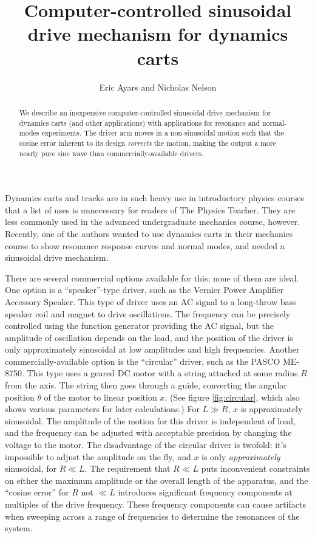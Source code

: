 \documentclass[11 pt]{article}
\title{Computer-controlled sinusoidal drive mechanism for dynamics carts}
\author{Eric Ayars and Nicholas Nelson}
\begin{document}
\maketitle

\begin{abstract}
We describe an inexpensive computer-controlled sinusoidal drive mechanism for dynamics carts (and other applications) with applications for resonance and normal-modes experiments.
The driver arm moves in a non-sinusoidal motion such that the cosine error inherent to its design \emph{corrects} the motion, making the output a more nearly pure sine wave than commercially-available drivers.
\end{abstract}

Dynamics carts and tracks are in such heavy use in introductory physics courses that a list of uses is unnecessary for readers of The Physics Teacher. 
They are less commonly used in the advanced undergraduate mechanics course, however.
Recently, one of the authors wanted to use dynamics carts in their mechanics course to show resonance response curves and normal modes, and needed a sinusoidal drive mechanism.

There are several commercial options available for this; none of them are ideal. 
One option is a ``speaker''-type driver, such as the Vernier Power Amplifier Accessory Speaker. 
This type of driver uses an AC signal to a long-throw bass speaker coil and magnet to drive oscillations. 
The frequency can be precisely controlled using the function generator providing the AC signal, but the amplitude of oscillation depends on the load, and the position of the driver is only approximately sinusoidal at low amplitudes and high frequencies.
Another commercially-available option is the ``circular'' driver, such as the PASCO ME-8750. 
This type uses a geared DC motor with a string attached at some radius $R$ from the axis. The string then goes through a guide, converting the angular position $\theta$ of the motor to linear position $x$. (See figure \ref{fig:circular}, which also shows various parameters for later calculations.) 
For $L\gg R$, $x$ is approximately sinusoidal. 
The amplitude of the motion for this driver is independent of load, and the frequency can be adjusted with acceptable precision by changing the voltage to the motor.
The disadvantage of the circular driver is twofold: it's impossible to adjust the amplitude on the fly, and $x$ is only \emph{approximately} sinusoidal, for $R\ll L$.
The requirement that $R \ll L$ puts inconvenient constraints on either the maximum amplitude or the overall length of the apparatus, and the ``cosine error'' for $R$ not $\ll L$ introduces significant frequency components at multiples of the drive frequency. 
These frequency components can cause artifacts when sweeping across a range of frequencies to determine the resonances of the system.
\end{document}
